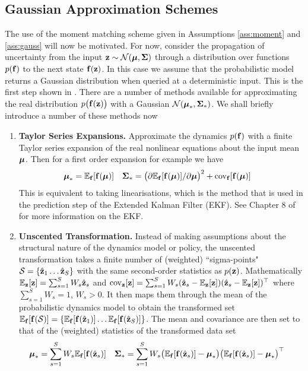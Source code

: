 \subsection{Gaussian Approximation Schemes}
The use of the moment matching scheme given in Assumptions \ref{ass:moment} and \ref{ass:gauss} will now be motivated. For now, consider the propagation of uncertainty from the input $\mathbf{z} \sim \mathcal{N}(\boldsymbol{\mu},\boldsymbol{\Sigma})$ through a distribution over functions $p(\mathbf{f})$ to the next state $\mathbf{f}(\mathbf{z})$. In this case we assume that the probabilistic model returns a Gaussian distribution when queried at a deterministic input. This is the first step shown in . There are a number of methods available for approximating the real distribution $p\big(\mathbf{f}(\mathbf{z})\big)$ with a Gaussian $\mathcal{N}(\boldsymbol{\mu}_*,\boldsymbol{\Sigma}_*)$. We shall briefly introduce a number of these methods now
%
\begin{enumerate}
\item {\bf Taylor Series Expansions.} Approximate the dynamics $p(\mathbf{f})$ with a finite Taylor series expansion of the real nonlinear equations about the input mean $\boldsymbol{\mu}$. Then for a first order expansion for example we have 
\begin{align*}
\boldsymbol{\mu}_* &= \mathbb{E}_{\mathbf{f}}[\mathbf{f}(\boldsymbol{\mu})] 
&\boldsymbol{\Sigma}_* &= \big( \partial\mathbb{E}_{\mathbf{f}}[\mathbf{f}(\boldsymbol{\mu})]/\partial\boldsymbol{\mu} \big)^2 + \mathrm{cov}_{\mathbf{f}}[\mathbf{f}(\boldsymbol{\mu})]
\end{align*}
This is equivalent to taking linearisations, which is the method that is used in the prediction step of the Extended Kalman Filter (EKF). See Chapter 8 of \cite{AnMo79} for more information on the EKF.
%
\item {\bf Unscented Transformation.} Instead of making assumptions about the structural nature of the dynamics model or policy, the unscented transformation takes a finite number of (weighted) ``sigma-points" $\mathcal{S} = \{\hat{\mathbf{z}}_{1} \dots \hat{\mathbf{z}}_{S}\}$ with the same second-order statistics as $p(\mathbf{z})$. Mathematically
$\mathbb{E}_{\mathbf{z}}[\mathbf{z}] = \sum_{s=1}^S W_s\hat{\mathbf{z}}_{s}$ and $\mathrm{cov}_{\mathbf{z}}[\mathbf{z}] = \sum_{s=1}^S W_s(\hat{\mathbf{z}}_{s}-\mathbb{E}_{\mathbf{z}}[\mathbf{z}])(\hat{\mathbf{z}}_{s}-\mathbb{E}_{\mathbf{z}}[\mathbf{z}])^\top$
where $\sum_{s=1}^S W_s=1$, $W_s > 0$. It then maps them through the mean of the probabilistic dynamics model to obtain the transformed set $\mathbb{E}_{\mathbf{f}}[\mathbf{f}(\mathcal{S})] = \{\mathbb{E}_{\mathbf{f}}[\mathbf{f}(\hat{\mathbf{z}}_{1})] \dots \mathbb{E}_{\mathbf{f}}[\mathbf{f}(\hat{\mathbf{z}}_{S})]\}$. The mean and covariance are then set to that of the (weighted) statistics of the transformed data set
\begin{align*}
\bm_* &= \sum_{s=1}^S W_s\EE_{\bff}[\bff(\hat\bz_{s})] 
&\bS_* &= \sum_{s=1}^S W_s\big(\EE_{\bff}[\bff(\hat\bz_{s})]-\bm_*\big)\big(\EE_{\bff}[\bff(\hat\bz_{s})]-\bm_*\big)\T

\end{align*}
\end{enumerate}
